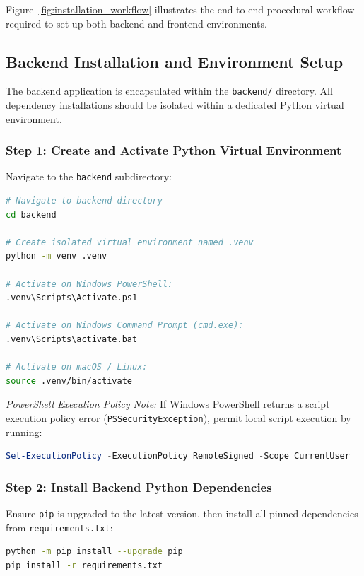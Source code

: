 Figure~\ref{fig:installation_workflow} illustrates the end-to-end procedural workflow required to set up both backend and frontend environments.

\subsection{Backend Installation and Environment Setup}
The backend application is encapsulated within the \texttt{backend/} directory. All dependency installations should be isolated within a dedicated Python virtual environment.

\subsubsection{Step 1: Create and Activate Python Virtual Environment}
Navigate to the \texttt{backend} subdirectory:

\begin{lstlisting}[language=bash, caption={Creating and Activating Virtual Environment}]
# Navigate to backend directory
cd backend

# Create isolated virtual environment named .venv
python -m venv .venv

# Activate on Windows PowerShell:
.venv\Scripts\Activate.ps1

# Activate on Windows Command Prompt (cmd.exe):
.venv\Scripts\activate.bat

# Activate on macOS / Linux:
source .venv/bin/activate
\end{lstlisting}

\noindent \textit{PowerShell Execution Policy Note:} If Windows PowerShell returns a script execution policy error (\texttt{PSSecurityException}), permit local script execution by running:
\begin{lstlisting}[language=powershell]
Set-ExecutionPolicy -ExecutionPolicy RemoteSigned -Scope CurrentUser
\end{lstlisting}

\subsubsection{Step 2: Install Backend Python Dependencies}
Ensure \texttt{pip} is upgraded to the latest version, then install all pinned dependencies from \texttt{requirements.txt}:

\begin{lstlisting}[language=bash, caption={Installing Backend Python Packages}]
python -m pip install --upgrade pip
pip install -r requirements.txt
\end{lstlisting}

